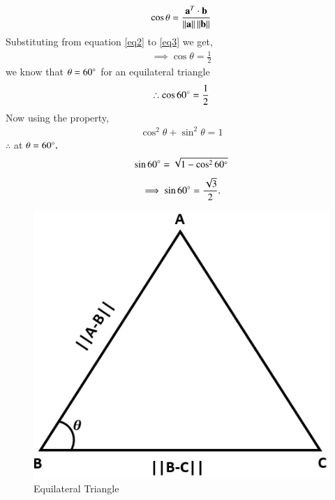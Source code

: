 \documentclass[journal,12pt,twocolumn]{IEEEtran}
\begin{document}
\begin{align}
\cos\theta = \frac{\mathbf{a}^T\cdot\mathbf{b}}{\left\lVert\mathbf{a}\right\rVert\left\lVert\mathbf{b}\right\rVert}
\end{align}
Substituting from equation \ref{eq2} to \ref{eq3} we get,
\begin{align}
\implies \cos\theta = \frac{1}{2}
\end{align}
we know that $\theta = 60\degree$ for an equilateral triangle 
\begin{align}
\therefore \cos60\degree = \frac{1}{2}
\end{align}
Now using the property,
\begin{align}
\cos^2\theta +\sin^2\theta = 1
\end{align} 
$\therefore$ at $\theta = 60\degree, $
\begin{align}
\sin60\degree = \sqrt{1-\cos^260\degree}
\end{align}
\begin{align}
\implies\sin60\degree = \frac{\sqrt{3}}{2}.
\end{align}
\begin{figure}
\centering
\includegraphics[width=\columnwidth]{a_4_2.png}
\caption{Equilateral Triangle}
\label{Fig 1}
\end{figure}
\end{document}
